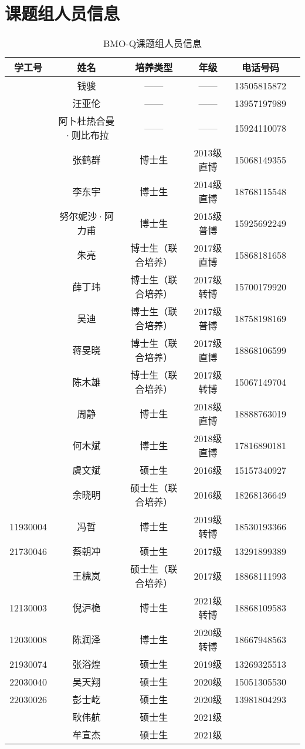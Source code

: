 \documentclass[cn,11pt,chinese]{elegantbook}
\begin{document}
\chapter{课题组人员信息}
\begin{table}[h]
  \centering
  \caption{BMO-Q课题组人员信息}
\begin{tabular}{cccccc}
\toprule
学工号 & 姓名 & 培养类型 & 年级 &电话号码 \\
\midrule
& 钱骏	&——&	——	&13505815872 \\
\hline
\hline
& 汪亚伦&	——&	——	&13957197989\\
&阿卜杜热合曼·则比布拉&	——&	——	&15924110078\\
&张鹤群&	博士生&	2013级直博	&15068149355\\
&李东宇&	博士生	&2014级直博&	18768115548\\
&努尔妮沙·阿力甫&	博士生&	2015级普博&	15925692249\\
&朱亮&	博士生（联合培养）&	2017级直博	&15868181658\\
&薛丁玮	&博士生（联合培养）	&2017级转博	&15700179920\\
&吴迪&	博士生（联合培养）&	2017级普博&	18758198169\\
&蒋旻晓&	博士生（联合培养）&	2017级直博&	18868106599\\
&陈木雄	&博士生（联合培养）&	2017级转博&	15067149704\\
&周静	&博士生	&2018级直博&	18888763019\\
&何木斌&	博士生&	2018级直博&	17816890181\\
&虞文斌	&硕士生&	2016级&	15157340927\\ 
&余晓明	&硕士生（联合培养）&	2016级	&18268136649\\
11930004&冯哲&	博士生&	2019级转博 &	18530193366\\
21730046&蔡朝冲&	硕士生&	2017级&	13291899389\\
&王槐岚	&硕士生（联合培养）&	2017级	&18868111993\\
12130003&倪沪桅	&博士生&	2021级转博&	18868109583\\
12030008&	陈润泽& 博士生&2020级转博&18667948563\\
21930074&张浴煌&硕士生&2019级& 13269325513\\
22030040	&吴天翔& 硕士生&2020级& 15051305530\\
22030026  &彭士屹&硕士生 &2020级 &13981804293 \\
&耿伟航&硕士生&2021级&\\
&牟宣杰&硕士生&2021级&\\

\bottomrule
\end{tabular}%
\label{tab:info}%

\end{table}
\end{document}
